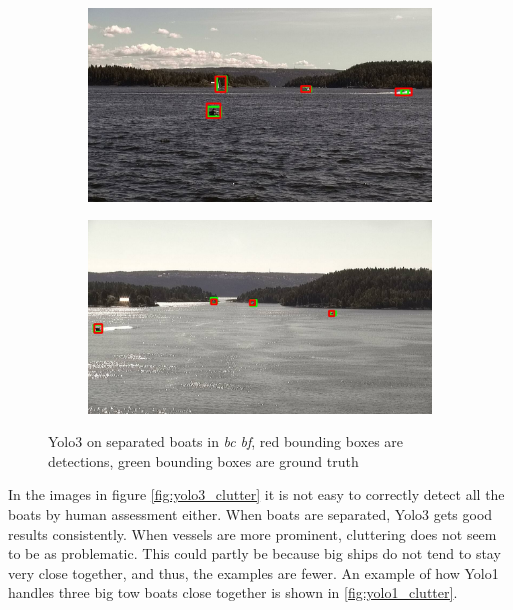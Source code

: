 \begin{figure}[h!]
\begin{subfigure}{.5\textwidth}
  \centering
  \includegraphics[width=0.8\linewidth]{discussion/good_ex/selected_08_14_frame1140.jpg}
\end{subfigure}%
\begin{subfigure}{.5\textwidth}
  \centering
  \includegraphics[width=.8\linewidth]{discussion/good_ex/selected_08_11_frame1380.jpg}
\end{subfigure}
\caption{Yolo3 on separated boats in \textit{bc} \textit{bf}, red bounding boxes are detections, green bounding boxes are ground truth}
\label{fig:yolo3_good_ex}
\end{figure}

In the images in figure \ref{fig:yolo3_clutter} it is not easy to correctly detect all the boats by human assessment either. When boats are separated, Yolo3 gets good results consistently. When vessels are more prominent, cluttering does not seem to be as problematic. This could partly be because big ships do not tend to stay very close together, and thus, the examples are fewer. An example of how Yolo1 handles three big tow boats close together is shown in \ref{fig:yolo1_clutter}.

